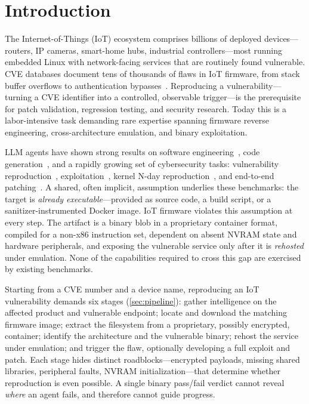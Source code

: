 \section{Introduction}
\label{sec:intro}

The Internet-of-Things (IoT) ecosystem comprises billions of deployed devices---routers, IP cameras, smart-home hubs, industrial controllers---most running embedded Linux with network-facing services that are routinely found vulnerable. CVE databases document tens of thousands of flaws in IoT firmware, from stack buffer overflows to authentication bypasses~\cite{cvedetails}. Reproducing a vulnerability---turning a CVE identifier into a controlled, observable trigger---is the prerequisite for patch validation, regression testing, and security research. Today this is a labor-intensive task demanding rare expertise spanning firmware reverse engineering, cross-architecture emulation, and binary exploitation.

LLM agents have shown strong results on software engineering~\cite{jimenez2024swebench}, code generation~\cite{chen2021codex}, and a rapidly growing set of cybersecurity tasks: vulnerability reproduction~\cite{wang2025cybergym}, exploitation~\cite{exploitgym,exploitbench}, kernel N-day reproduction~\cite{krepror}, and end-to-end patching~\cite{cybergyme2e}. A shared, often implicit, assumption underlies these benchmarks: the target is \emph{already executable}---provided as source code, a build script, or a sanitizer-instrumented Docker image. IoT firmware violates this assumption at every step. The artifact is a binary blob in a proprietary container format, compiled for a non-x86 instruction set, dependent on absent NVRAM state and hardware peripherals, and exposing the vulnerable service only after it is \emph{rehosted} under emulation. None of the capabilities required to cross this gap are exercised by existing benchmarks.

Starting from a CVE number and a device name, reproducing an IoT vulnerability demands six stages (\cref{sec:pipeline}): gather intelligence on the affected product and vulnerable endpoint; locate and download the matching firmware image; extract the filesystem from a proprietary, possibly encrypted, container; identify the architecture and the vulnerable binary; rehost the service under emulation; and trigger the flaw, optionally developing a full exploit and patch. Each stage hides distinct roadblocks---encrypted payloads, missing shared libraries, peripheral faults, NVRAM initialization---that determine whether reproduction is even possible. A single binary pass/fail verdict cannot reveal \emph{where} an agent fails, and therefore cannot guide progress.

